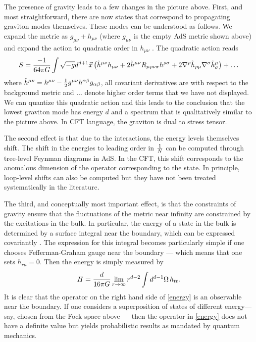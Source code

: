 \documentclass[12pt]{article}
\def\gnewt{G}
\newcommand{\be}{\begin{equation}}
\newcommand{\ee}{\end{equation}}
\begin{document}
The presence of gravity leads to a few changes in the picture above.  First, and most straightforward, there are now states that correspond to propagating graviton modes themselves. These modes can be understood as follows. We expand the metric as $g_{\mu \nu} + h_{\mu \nu}$ (where $g_{\mu \nu}$ is the empty AdS metric shown above) and expand the action to quadratic order in $h_{\mu \nu}$ \cite{Christensen:1979iy}. The quadratic action reads
\begin{equation}
\label{gravityquadratic}
S = {-1 \over 64 \pi \gnewt} \int \sqrt{-g} d^{d+1} \vec{x}  \left(\tilde{h}^{\mu \nu} \Box h_{\mu \nu} + 2 \tilde{h}^{\mu \nu} R_{\mu \rho \nu \sigma} h^{\rho \sigma}  + 2 \nabla^{\rho} \tilde{h}_{\rho \mu} \nabla^{\sigma} \tilde{h}_{\sigma}^{\mu} \right) + \ldots
\end{equation}
where $\tilde{h}^{\mu \nu} = h^{\mu \nu} - {1 \over 2} g^{\mu \nu} h^{\alpha \beta} g_{\alpha \beta}$,  all covariant
derivatives are with respect to the background metric and $\ldots$ denote higher order terms that we have not displayed. We can quantize this quadratic action and this leads to the conclusion that the lowest graviton mode has energy $d$ and a spectrum that is qualitatively similar to the picture above. In CFT language, the graviton is dual to stress tensor.

The second effect is that due to the interactions,  the energy levels themselves shift. The shift in the energies to leading order in ${1 \over N}$  can be computed through tree-level Feynman diagrams in AdS. In the CFT,  this shift corresponds to the anomalous dimension of the operator corresponding to the state.  In principle, loop-level shifts can also be computed but they have not been treated systematically in
the literature.

The third, and conceptually most important effect, is that the constraints of gravity ensure that the fluctuations of the metric near infinity are constrained by the excitations in the bulk. In particular, the energy of a state
in the bulk is determined by a surface integral near the boundary, which can be expressed covariantly \cite{Balasubramanian:1999re}. The expression for this integral becomes particularly simple   \cite{deHaro:2000vlm} if one chooses Fefferman-Graham gauge near the boundary --- which means that one sets $h_{r \mu} = 0$. Then the energy is simply measured by
\be
\label{energy}
H = {d \over 16 \pi \gnewt} \lim_{r \rightarrow \infty} r^{d-2} \int  d^{d-1} \Omega \, h_{t t}.
\ee
It is clear that the operator on the right hand side of \eqref{energy} is an observable near the boundary. If one considers a superposition of states of different energy--- say, chosen from the Fock space above --- then the operator in \eqref{energy} does not have a definite value but yields probabilistic results as mandated by quantum mechanics.
\end{document}
